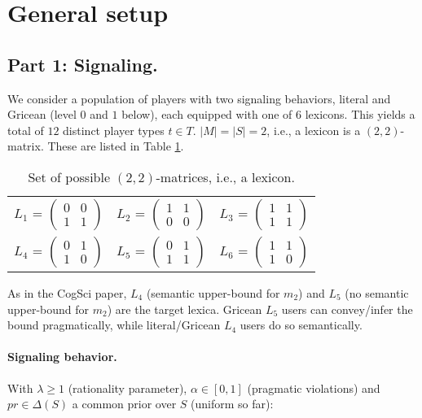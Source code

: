 \documentclass[11pt]{article}
\begin{document}
\section{General setup}
\subsection{Part 1: Signaling.}

We consider a population of players with two signaling behaviors, literal and Gricean (level $0$ and $1$ below), each equipped with one of $6$ lexicons. This yields a total of $12$ distinct player types $t \in T$. $|M| = |S| = 2$, i.e., a lexicon is a $(2,2)$-matrix. These are listed in Table \ref{tab:lexica}. 

\begin{table}[h]
\centering 
\begin{tabular}{l c l}
$L_1$ = $\begin{pmatrix} 0 & 0 \\ 1 & 1 \end{pmatrix}$ & 
$L_2$ = $\begin{pmatrix} 1 & 1 \\ 0 & 0 \end{pmatrix}$ & 
$L_3$ = $\begin{pmatrix} 1 & 1 \\ 1 & 1 \end{pmatrix}$\\[0.5cm]

$L_4$ = $\begin{pmatrix} 0 & 1 \\ 1 & 0 \end{pmatrix}$ &
$L_5$ = $\begin{pmatrix} 0 & 1 \\ 1 & 1 \end{pmatrix}$ &
$L_6$ = $\begin{pmatrix} 1 & 1 \\ 1 & 0 \end{pmatrix}$
\end{tabular}
\caption{{\footnotesize Set of possible $(2,2)$-matrices, i.e., a lexicon.}}
\label{tab:lexica}
\end{table}

As in the CogSci paper, $L_4$ (semantic upper-bound for $m_2$) and $L_5$ (no semantic upper-bound for $m_2$) are the target lexica. Gricean $L_5$ users can convey/infer the bound pragmatically, while literal/Gricean $L_4$ users do so semantically.

\paragraph{Signaling behavior.} With $\lambda \geq 1$ (rationality parameter), $\alpha \in [0,1]$ (pragmatic violations) and $pr \in \Delta(S)$ a common prior over $S$ (uniform so far):
\end{document}
